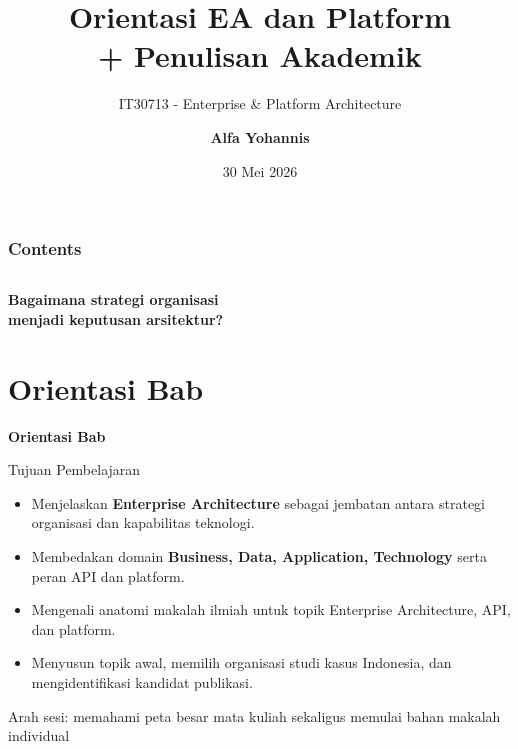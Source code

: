 \documentclass[aspectratio=169, table]{beamer}
\title{\huge Orientasi EA dan Platform\\
  \vspace{8pt}
  + Penulisan Akademik}
\subtitle{IT30713 - Enterprise \& Platform Architecture}
\author{\textbf{Alfa Yohannis}}
\date{30 Mei 2026}
\newcommand{\sectionframe}[1]{%
  \begin{frame}{\hfill}
    \centering
    \Huge{\textbf{#1}}
  \end{frame}
}
\newcommand{\takeaway}[1]{%
  \vspace{4pt}
  {\footnotesize #1}
}
\begin{document}
\frame{\titlepage}

\begin{frame}[fragile]
  \frametitle{Contents}
  \vspace{20pt}
  \begin{columns}[t]
    \tableofcontents[sections={1-4}]

    \tableofcontents[sections={5-8}]
  \end{columns}
\end{frame}

\begin{frame}{\hfill}
  \centering
  \Huge{\textbf{Bagaimana strategi organisasi\\menjadi keputusan arsitektur?}}
\end{frame}

\section{Orientasi Bab}
\sectionframe{Orientasi Bab}

\begin{frame}{Tujuan Pembelajaran}
  \vspace{8pt}
  \begin{itemize}
    \item Menjelaskan \textbf{Enterprise Architecture} sebagai jembatan antara strategi organisasi dan kapabilitas teknologi.
    \item Membedakan domain \textbf{Business, Data, Application, Technology} serta peran API dan platform.
    \item Mengenali anatomi makalah ilmiah untuk topik Enterprise Architecture, API, dan platform.
    \item Menyusun topik awal, memilih organisasi studi kasus Indonesia, dan mengidentifikasi kandidat publikasi.
  \end{itemize}

  \takeaway{Arah sesi: memahami peta besar mata kuliah sekaligus memulai bahan makalah individual}
\end{frame}
\end{document}
